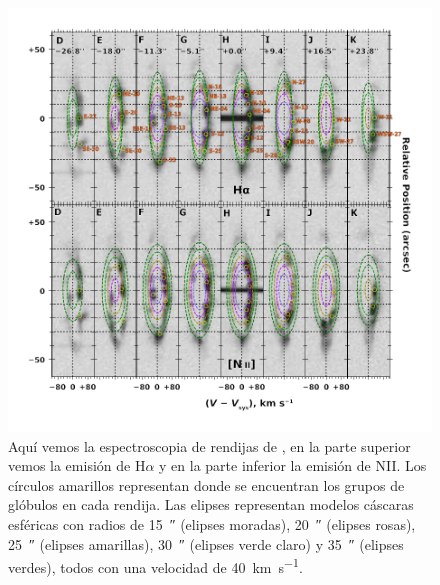 \documentclass{book}
\begin{document}
\begin{figure}[htb]
    \centering
    \includegraphics[width=\textwidth]{Nuevas imagenes finales/zavala-slit-spectra-select-annotated.pdf}
    \caption{Aquí vemos la espectroscopia de rendijas de
      \cite{Zavala:2022}, en la parte superior vemos la emisión de
      H$\alpha$ y en la parte inferior la emisión de NII. Los círculos
      amarillos representan donde se encuentran los grupos de glóbulos
      en cada rendija. Las elipses representan modelos cáscaras
      esféricas con radios de \SI{15}{\arcsecond} (elipses moradas),
      \SI{20}{\arcsecond} (elipses rosas), \SI{25}{\arcsecond}
      (elipses amarillas), \SI{30}{\arcsecond} (elipses verde claro) y
      \SI{35}{\arcsecond} (elipses verdes), todos con una velocidad de
      \SI{40}{km.s^{-1}}.}
    \label{fig:zavala_nudos}
\end{figure}
\end{document}

